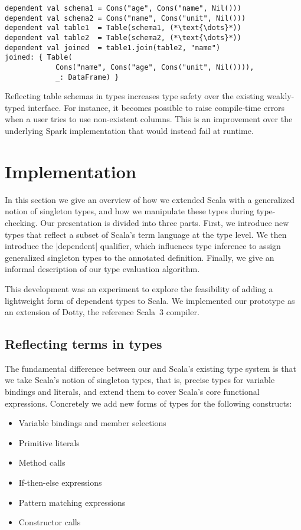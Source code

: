 \begin{lstlisting}
dependent val schema1 = Cons("age", Cons("name", Nil()))
dependent val schema2 = Cons("name", Cons("unit", Nil()))
dependent val table1  = Table(schema1, (*\text{\dots}*))
dependent val table2  = Table(schema2, (*\text{\dots}*))
dependent val joined  = table1.join(table2, "name")
joined: { Table(
            Cons("name", Cons("age", Cons("unit", Nil()))),
            _: DataFrame) }
\end{lstlisting}

\noindent
Reflecting table schemas in types increases type safety over the existing weakly-typed interface.
For instance, it becomes possible to raise compile-time errors when a user tries to use non-existent columns.
This is an improvement over the underlying Spark implementation that would instead fail at runtime.

\section{Implementation}
\label{sec:extending-scala}

In this section we give an overview of how we extended Scala with a generalized notion of singleton types, and how we manipulate these types during type-checking.
Our presentation is divided into three parts.
First, we introduce new types that reflect a subset of Scala's term language at the type level.
We then introduce the |dependent| qualifier, which influences type inference to assign generalized singleton types to the annotated definition.
Finally, we give an informal description of our type evaluation algorithm.

This development was an experiment to explore the feasibility of adding a lightweight form of dependent types to Scala.
We implemented our prototype as an extension of Dotty, the reference Scala~3 compiler.

\subsection{Reflecting terms in types}

The fundamental difference between our and Scala's existing type system is that we take Scala's notion of singleton types, that is, precise types for variable bindings and literals, and extend them to cover Scala's core functional expressions.
Concretely we add new forms of types for the following constructs:

\begin{itemize}
  \item Variable bindings and member selections
  \item Primitive literals
  \item Method calls
  \item If-then-else expressions
  \item Pattern matching expressions
  \item Constructor calls
\end{itemize}

